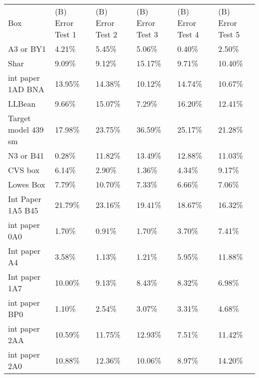 \documentclass[11pt, twoside, reqno]{book}
\begin{document}
\begin{table}[]
	\centering

	\label{AR1F}
	\tiny
	\begin{tabular}{llllll}
		Box                 & (B) Error Test 1 & (B) Error Test 2 & (B) Error Test 3 & (B) Error Test 4 & (B) Error Test 5 \\
		A3 or BY1           & 4.21\%           & 5.45\%           & 5.06\%           & 0.40\%           & 2.50\%           \\
		Shar                & 9.09\%           & 9.12\%           & 15.17\%          & 9.71\%           & 10.40\%          \\
		int paper 1AD BNA   & 13.95\%          & 14.38\%          & 10.12\%          & 14.74\%          & 10.67\%          \\
		LLBean              & 9.66\%           & 15.07\%          & 7.29\%           & 16.20\%          & 12.41\%          \\
		Target model 439 sm & 17.98\%          & 23.75\%          & 36.59\%          & 25.17\%          & 21.28\%          \\
		N3 or B41           & 0.28\%           & 11.82\%          & 13.49\%          & 12.88\%          & 11.03\%          \\
		CVS box             & 6.14\%           & 2.90\%           & 1.36\%           & 4.34\%           & 9.17\%           \\
		Lowes Box           & 7.79\%           & 10.70\%          & 7.33\%           & 6.66\%           & 7.06\%           \\
		Int Paper 1A5 B45   & 21.79\%          & 23.16\%          & 19.41\%          & 18.67\%          & 16.32\%          \\
		int paper 0A0       & 1.70\%           & 0.91\%           & 1.70\%           & 3.70\%           & 7.41\%           \\
		Int paper A4        & 3.58\%           & 1.13\%           & 1.21\%           & 5.95\%           & 11.88\%          \\
		Int paper 1A7       & 10.00\%          & 9.13\%           & 8.43\%           & 8.32\%           & 6.98\%           \\
		int paper BP0       & 1.10\%           & 2.54\%           & 3.07\%           & 3.31\%           & 4.68\%           \\
		int paper 2AA       & 10.59\%          & 11.75\%          & 12.93\%          & 7.51\%           & 11.42\%          \\
		int paper 2A0       & 10.88\%          & 12.36\%          & 10.06\%          & 8.97\%           & 14.20\%          \\

\end{tabular}
\end{table}
\end{document}
